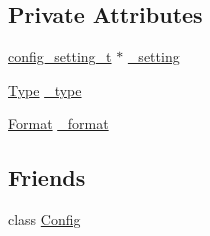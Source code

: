 \subsection*{Private Attributes}
\begin{DoxyCompactItemize}
\item 
\hyperlink{structconfig__setting__t}{config\-\_\-setting\-\_\-t} $\ast$ \hyperlink{classlibconfig_1_1Setting_ace7debd950cda166c1b0d6c482cff0ef}{\-\_\-setting}
\item 
\hyperlink{classlibconfig_1_1Setting_a42f760ff88654e784477a6f040267bb4}{Type} \hyperlink{classlibconfig_1_1Setting_a0c17fb66c117aed38b4566d3a24e14c5}{\-\_\-type}
\item 
\hyperlink{classlibconfig_1_1Setting_a35034c3fd8c1b2e8e590b6f53083106e}{Format} \hyperlink{classlibconfig_1_1Setting_a0adb3518c70479c207e0806496fb6bf3}{\-\_\-format}
\end{DoxyCompactItemize}
\subsection*{Friends}
\begin{DoxyCompactItemize}
\item 
class \hyperlink{classlibconfig_1_1Setting_ac3da7e21a05bf8852638db7e4dd1b81a}{Config}
\end{DoxyCompactItemize}


